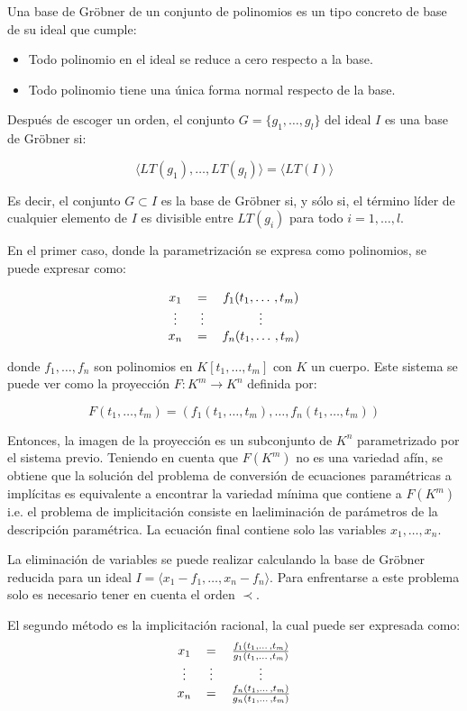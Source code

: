 Una base de Gröbner de un conjunto de polinomios es un tipo concreto de base de su ideal que cumple:

\begin{itemize}
    \item Todo polinomio en el ideal se reduce a cero respecto a la base.
    \item Todo polinomio tiene una única forma normal respecto de la base.
\end{itemize}

Después de escoger un orden, el conjunto $G = \{ g_1, \dotso, g_l \}$ del ideal $I$ es una base de Gröbner si:

$$\langle LT(g_1), \dotso, LT(g_l) \rangle = \langle LT(I) \rangle$$

Es decir, el conjunto $G \subset I$ es la base de Gröbner si, y sólo si, el término líder de cualquier elemento de $I$ es divisible entre $LT(g_i)$ para todo $i = 1, \dotso, l$.
\par
En el primer caso, donde la parametrización se expresa como polinomios, se puede expresar como:

\begin{equation}
\begin{tabular}{c c c}
$x_1$ & $=$ & $f_1(t_1, \dotso, t_m)$ \\
$\vdots$ & $\vdots$ & $\vdots$ \\
$x_n$ & $=$ & $f_n(t_1, \dotso, t_m)$
\end{tabular}
\nonumber
\end{equation}

donde $f_1, \dotso, f_n$ son polinomios en $K[t_1, \dotso, t_m]$ con $K$ un cuerpo. Este sistema se puede ver como la proyección $F : K^m \to K^n$ definida por:

$$F(t_1,\dotso, t_m) = (f_1(t_1,\dotso, t_m), \dotso, f_n(t_1,\dotso, t_m))$$

Entonces, la imagen de la proyección es un subconjunto de $K^n$ parametrizado por el sistema previo. Teniendo en cuenta que $F(K^m)$ no es una variedad afín, se obtiene que la solución del problema de conversión de ecuaciones paramétricas a implícitas es equivalente a encontrar la variedad mínima que contiene a $F(K^m)$ i.e. el problema de implicitación consiste en laeliminación de parámetros de la descripción paramétrica. La ecuación final contiene solo las variables $x_1, \dotso, x_n$.
\par
La eliminación de variables se puede realizar calculando la base de Gröbner reducida para un ideal $I = \langle x_1 - f_1, \dotso, x_n - f_n \rangle$. Para enfrentarse a este problema solo es necesario tener en cuenta el orden $\prec$.
\par
El segundo método es la implicitación racional, la cual puede ser expresada como:
\begin{equation}
\begin{tabular}{c c c}
$x_1$ & $=$ & $\frac{f_1(t_1, \dotso, t_m)}{g_1(t_1, \dotso, t_m)}$ \\
$\vdots$ & $\vdots$ & $\vdots$ \\
$x_n$ & $=$ & $\frac{f_n(t_1, \dotso, t_m)}{g_n(t_1, \dotso, t_m)}$
\end{tabular}
\nonumber
\end{equation}


